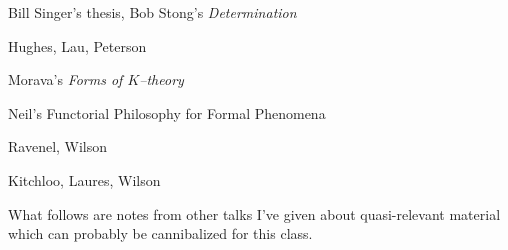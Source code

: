 \documentclass[12pt]{book}
\newcommand{\<}{\langle}
\renewcommand{\>}{\rangle}
\numberwithin{equation}{section}
\theoremstyle{plain}
\theoremstyle{definition}
\theoremstyle{remark}
\begin{document}
Bill Singer's thesis, Bob Stong's \textit{Determination}

Hughes, Lau, Peterson

Morava's \textit{Forms of $K$--theory}

Neil's Functorial Philosophy for Formal Phenomena

Ravenel, Wilson

Kitchloo, Laures, Wilson




\newpage
\newpage
\newpage

\vspace{20\baselineskip}

\begin{center}
What follows are notes from other talks I've given about quasi-relevant material which can probably be cannibalized for this class.
\end{center}



%
\end{document}
